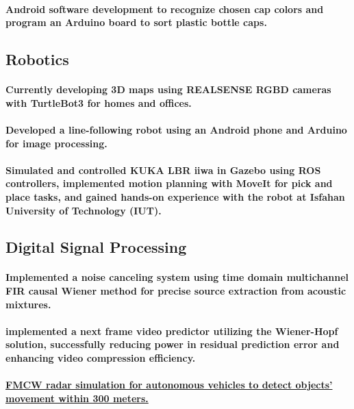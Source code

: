 \documentclass[a4paper]{article}
\begin{document}
\paragraph{Android software development to recognize chosen cap colors and program an Arduino board to sort plastic bottle caps.}

\subsection{Robotics}
            
\paragraph{Currently developing 3D maps using REALSENSE RGBD cameras with TurtleBot3 for homes and offices.}
\paragraph{Developed a line-following robot using an Android phone and Arduino for image processing.}
\paragraph{Simulated and controlled KUKA LBR iiwa in Gazebo using ROS controllers, implemented motion planning with MoveIt for pick and place tasks, and gained hands-on experience with the robot at Isfahan University of Technology (IUT).}
\subsection{Digital Signal Processing}
\paragraph{Implemented a noise canceling system using time domain multichannel FIR causal Wiener method for precise source extraction from acoustic mixtures.}
\paragraph{implemented a next frame video predictor utilizing the Wiener-Hopf solution, successfully reducing power in residual prediction error and enhancing video compression efficiency.}
\paragraph{\href{https://github.com/ake1999/FMCW_Radar_Ake}{FMCW radar simulation for autonomous vehicles to detect objects' movement within 300 meters.}}
\end{document}
